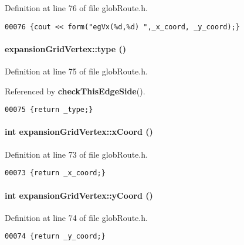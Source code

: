 Definition at line 76 of file glob\-Route.h.\small\begin{verbatim}00076 {cout << form("egVx(%d,%d) ",_x_coord, _y_coord);}
\end{verbatim}\normalsize 
\label{expansionGridVertex_a5}
\paragraph{ expansion\-Grid\-Vertex::type ()\hspace{0.3cm}{\tt  [inline]}}\hfill



Definition at line 75 of file glob\-Route.h.

Referenced by {\bf check\-This\-Edge\-Side}().\small\begin{verbatim}00075 {return _type;}
\end{verbatim}\normalsize 
\label{expansionGridVertex_a3}
\paragraph{\setlength{\rightskip}{0pt plus 5cm}int expansion\-Grid\-Vertex::x\-Coord ()\hspace{0.3cm}{\tt  [inline]}}\hfill



Definition at line 73 of file glob\-Route.h.\small\begin{verbatim}00073 {return _x_coord;}
\end{verbatim}\normalsize 
\label{expansionGridVertex_a4}
\paragraph{\setlength{\rightskip}{0pt plus 5cm}int expansion\-Grid\-Vertex::y\-Coord ()\hspace{0.3cm}{\tt  [inline]}}\hfill



Definition at line 74 of file glob\-Route.h.\small\begin{verbatim}00074 {return _y_coord;}
\end{verbatim}\normalsize 


